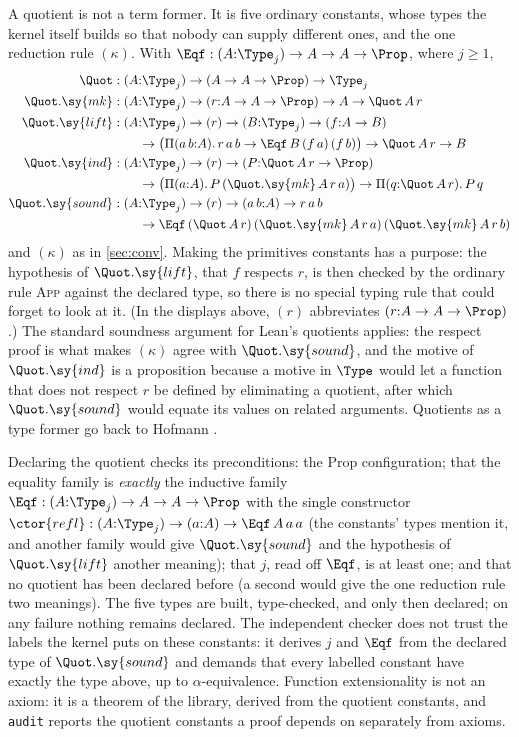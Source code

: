 A quotient is not a term former.
It is five ordinary constants, whose types the kernel itself builds so that nobody can supply different ones, and the one reduction rule $(\kappa)$.
With $\Eqf : (A{:}\Type_j)\to A\to A\to\Prop$, where $j\ge1$,
\begin{align*}
\Quot &: (A{:}\Type_j)\to (A\to A\to\Prop)\to\Type_j\\
\Quot.\sy{mk} &: (A{:}\Type_j)\to(r{:}A\to A\to\Prop)\to A\to \Quot\,A\,r\\
\Quot.\sy{lift} &: (A{:}\Type_j)\to(r)\to(B{:}\Type_j)\to(f{:}A\to B)\\
  &\qquad\to\bigl(\Pi(a\,b{:}A).\,r\,a\,b\to\Eqf\,B\,(f\,a)\,(f\,b)\bigr)\to\Quot\,A\,r\to B\\
\Quot.\sy{ind} &: (A{:}\Type_j)\to(r)\to(P{:}\Quot\,A\,r\to\Prop)\\
  &\qquad\to\bigl(\Pi(a{:}A).\,P\,(\Quot.\sy{mk}\,A\,r\,a)\bigr)\to\Pi(q{:}\Quot\,A\,r).\,P\,q\\
\Quot.\sy{sound} &: (A{:}\Type_j)\to(r)\to(a\,b{:}A)\to r\,a\,b\\
  &\qquad\to\Eqf\,(\Quot\,A\,r)\,(\Quot.\sy{mk}\,A\,r\,a)\,(\Quot.\sy{mk}\,A\,r\,b)
\end{align*}
and $(\kappa)$ as in \cref{sec:conv}.
Making the primitives constants has a purpose: the hypothesis of $\Quot.\sy{lift}$, that $f$ respects $r$, is then checked by the ordinary rule \textsc{App} against the declared type, so there is no special typing rule that could forget to look at it.
(In the displays above, $(r)$ abbreviates $(r{:}A\to A\to\Prop)$.)
The standard soundness argument for Lean's quotients \citep{carneiro19} applies: the respect proof is what makes $(\kappa)$ agree with $\Quot.\sy{sound}$, and the motive of $\Quot.\sy{ind}$ is a proposition because a motive in $\Type$ would let a function that does not respect $r$ be defined by eliminating a quotient, after which $\Quot.\sy{sound}$ would equate its values on related arguments.
Quotients as a type former go back to Hofmann \citep{hofmann95quot}.

Declaring the quotient checks its preconditions: the Prop configuration; that the equality family is \emph{exactly} the inductive family $\Eqf : (A{:}\Type_j)\to A\to A\to\Prop$ with the single constructor $\ctor{refl} : (A{:}\Type_j)\to(a{:}A)\to\Eqf\,A\,a\,a$ (the constants' types mention it, and another family would give $\Quot.\sy{sound}$ and the hypothesis of $\Quot.\sy{lift}$ another meaning); that $j$, read off $\Eqf$, is at least one; and that no quotient has been declared before (a second would give the one reduction rule two meanings).
The five types are built, type-checked, and only then declared; on any failure nothing remains declared.
The independent checker does not trust the labels the kernel puts on these constants: it derives $j$ and $\Eqf$ from the declared type of $\Quot.\sy{sound}$ and demands that every labelled constant have exactly the type above, up to $\alpha$-equivalence.
Function extensionality is not an axiom: it is a theorem of the library, derived from the quotient constants, and \texttt{audit} reports the quotient constants a proof depends on separately from axioms.
